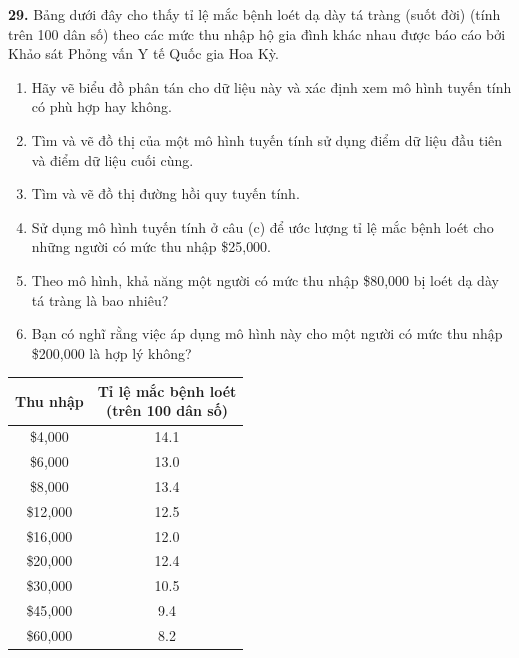 \documentclass[10pt]{article}
\begin{document}
\begin{minipage}[t]{0.48\textwidth}
\vspace{0.25cm}
\noindent
\techicon\textbf{29.} Bảng dưới đây cho thấy tỉ lệ mắc bệnh loét dạ dày tá tràng (suốt đời) (tính trên 100 dân số) theo các mức thu nhập hộ gia đình khác nhau được báo cáo bởi Khảo sát Phỏng vấn Y tế Quốc gia Hoa Kỳ.
\begin{enumerate}[label=(\alph*), leftmargin=*, itemsep=2pt, topsep=2pt]
    \item Hãy vẽ biểu đồ phân tán cho dữ liệu này và xác định xem mô hình tuyến tính có phù hợp hay không.
    \item Tìm và vẽ đồ thị của một mô hình tuyến tính sử dụng điểm dữ liệu đầu tiên và điểm dữ liệu cuối cùng.
    \item Tìm và vẽ đồ thị đường hồi quy tuyến tính.
    \item Sử dụng mô hình tuyến tính ở câu (c) để ước lượng tỉ lệ mắc bệnh loét cho những người có mức thu nhập \$25{,}000.
    \item Theo mô hình, khả năng một người có mức thu nhập \$80{,}000 bị loét dạ dày tá tràng là bao nhiêu?
    \item Bạn có nghĩ rằng việc áp dụng mô hình này cho một người có mức thu nhập \$200{,}000 là hợp lý không?
\end{enumerate}

\vspace{0.2cm}
\begin{center}
\renewcommand{\arraystretch}{1.12}
\begin{tabular}{|c|c|}
\hline
\rowcolor{stewarttableheader}
Thu nhập & \makecell{Tỉ lệ mắc bệnh loét\\(trên 100 dân số)} \\
\hline
\$4{,}000  & 14.1 \\
\$6{,}000  & 13.0 \\
\$8{,}000  & 13.4 \\
\$12{,}000 & 12.5 \\
\$16{,}000 & 12.0 \\
\$20{,}000 & 12.4 \\
\$30{,}000 & 10.5 \\
\$45{,}000 & 9.4 \\
\$60{,}000 & 8.2 \\
\hline
\end{tabular}
\end{center}
\end{minipage}%
\hfill
\end{document}
